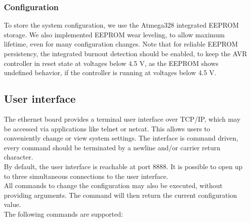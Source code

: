 \documentclass[a4paper]{scrreprt}
\begin{document}
\subsubsection{Configuration}
To store the system configuration, we use the Atmega328 integrated EEPROM storage. We also implemented EEPROM wear leveling, to allow
maximum lifetime, even for many configuration changes. Note that for reliable EEPROM persistency, the integrated burnout detection should be enabled, to keep the AVR controller in reset state at voltages below 4.5 V, as the EEPROM shows undefined behavior, if the controller is running at voltages below 4.5 V.
\subsection{User interface}
The ethernet board provides a terminal user interface over TCP/IP, which may be accessed via applications like telnet or netcat.
This allows users to conveniently change or view system settings. The interface is command driven, every command should be terminated
by a newline and/or carrier return character.\\
By default, the user interface is reachable at port 8888.
It is possible to open up to three simultaneous connections to the user interface.\\
All commands to change the configuration may also be executed, without providing
arguments. The command will then return the current configuration value.\\
The following commands are supported:
\end{document}

